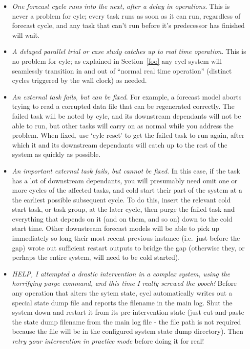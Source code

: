 \documentclass[11pt,a4paper]{article}
\begin{document}
\begin{itemize}
    \item {\em One forecast cycle runs into the next, after a delay in
        operations}. This is never a problem for cylc; every task runs
        as soon as it can run, regardless of forecast cycle, and any
        task that can't run before it's predecessor has finished will
        wait.

    \item {\em A delayed parallel trial or case study catches up to real
        time operation}. This is no problem for cylc; as explained in
        Section~\ref{foo} any cycl system will seamlessly transition in
        and out of ``normal real time operation'' (distinct cycles
        triggered by the wall clock) as needed.

    \item {\em An external task fails, but can be fixed}. For example, a
        forecast model aborts trying to read a corrupted data file that
        can be regenerated correctly. The failed task will be noted by
        cylc, and its downstream dependants will not be able to run,
        but other tasks will carry on as normal while you address the
        problem. When fixed, use `cylc reset' to get the failed task to
        run again, after which it and its downstream dependants will
        catch up to the rest of the system as quickly as possible.

    \item {\em An important external task fails, but cannot be fixed.}
        In this case, if the task has a lot of downstream dependants,
        you will presumably need omit one or more cycles of the affected
        tasks, and cold start their part of the system at a the earliest
        possible subsequent cycle.  To do this, insert the relevant cold
        start task, or task group, at the later cycle, then purge the
        failed task and everything that depends on it (and on them, and
        so on) down to the cold start time.  Other downstream forecast
        models will be able to pick up immediately so long their most
        recent previous instance (i.e.\ just before the gap) wrote out
        sufficient restart outputs to bridge the gap (otherwise they,
        or perhaps the entire system, will need to be cold started). 

    \item {\em HELP, I attempted a drastic intervention in a complex
        system, using the horrifying purge command, and this time I
        really screwed the pooch!} Before any operation that alters the
        sytem state, cycl automatically writes out a special state dump
        file and reports the filename in the main log. Shut the system
        down and restart it from its pre-intervention state (just
        cut-and-paste the state dump filename from the main log file -
        the file path is not required because the file will be in the
        configured system state dump directory).  Then {\em retry your
        intervention in practice mode} before doing it for real!

\end{itemize}
\end{document}
